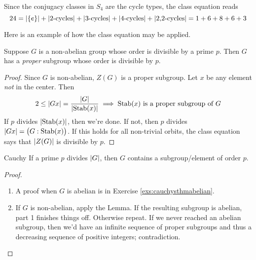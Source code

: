 \begin{example}{}{}
	Since the conjugacy classes in $S_4$ are the cycle types, the class equation reads
	\[
		24=\left| \{e\}\right| +\left| \text{2-cycles}\right| +\left| \text{3-cycles}\right| +\left| \text{4-cycles}\right| +\left| \text{2,2-cycles}\right|
		=1+6+8+6+3
	\]
\end{example}

Here is an example of how the class equation may be applied.

\begin{lemm}{}{}
	Suppose $G$ is a non-abelian group whose order is divisible by a prime $p$. Then $G$ has a \emph{proper} subgroup whose order is divisible by $p$.
\end{lemm}

\begin{proof}
	Since $G$ is non-abelian, $Z(G)$ is a proper subgroup. Let $x$ be any element \emph{not} in the center. Then
	\[
		2\le \left| Gx\right|=\frac{\left| G\right|}{\left| \operatorname{Stab}(x)\right|} 
		\implies \operatorname{Stab}(x)\text{ is a proper subgroup of }G
	\]
	If $p$ divides $\left| \operatorname{Stab}(x)\right|$, then we're done. If not, then $p$ divides $\left| Gx\right|=\bigl(G:\operatorname{Stab}(x)\bigr)$. If this holds for all non-trivial orbits, the class equation says that $\left| Z(G)\right|$ is divisible by $p$.
\end{proof}


\begin{thm}{Cauchy}{}
	If a prime $p$ divides $\left| G\right|$, then $G$ contains a subgroup/element of order $p$. 
\end{thm}


\begin{proof}
	\begin{enumerate}
	  \item A proof when $G$ is abelian is in Exercise \ref{exs:cauchysthmabelian}.
	  \item If $G$ is non-abelian, apply the Lemma. If the resulting subgroup is abelian, part 1 finishes things off. Otherwise repeat. If we never reached an abelian subgroup, then we'd have an infinite sequence of proper subgroups and thus a decreasing sequence of positive integers; contradiction.\qedhere
	\end{enumerate}
\end{proof}


